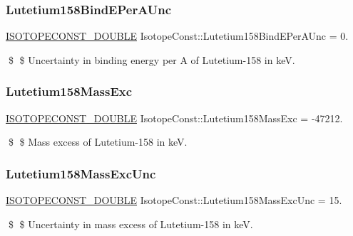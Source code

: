 \subsubsection{\texorpdfstring{Lutetium158\+Bind\+E\+Per\+A\+Unc}{Lutetium158BindEPerAUnc}}
{\footnotesize\ttfamily \mbox{\hyperlink{group___isotope_const-_macros_ga8f45a7272ce02c0b4c65c44636ed719a}{I\+S\+O\+T\+O\+P\+E\+C\+O\+N\+S\+T\+\_\+\+D\+O\+U\+B\+LE}} Isotope\+Const\+::\+Lutetium158\+Bind\+E\+Per\+A\+Unc = 0.}

\$ \$ Uncertainty in binding energy per A of Lutetium-\/158 in keV. \mbox{\label{group___isotope_const-_lutetium-_lu158_ga5008222e3ab0ffd98f5446f3a28b42ee}} 
\subsubsection{\texorpdfstring{Lutetium158\+Mass\+Exc}{Lutetium158MassExc}}
{\footnotesize\ttfamily \mbox{\hyperlink{group___isotope_const-_macros_ga8f45a7272ce02c0b4c65c44636ed719a}{I\+S\+O\+T\+O\+P\+E\+C\+O\+N\+S\+T\+\_\+\+D\+O\+U\+B\+LE}} Isotope\+Const\+::\+Lutetium158\+Mass\+Exc = -\/47212.}

\$ \$ Mass excess of Lutetium-\/158 in keV. \mbox{\label{group___isotope_const-_lutetium-_lu158_gaa4c09ac96b810bd100655731135d9962}} 
\subsubsection{\texorpdfstring{Lutetium158\+Mass\+Exc\+Unc}{Lutetium158MassExcUnc}}
{\footnotesize\ttfamily \mbox{\hyperlink{group___isotope_const-_macros_ga8f45a7272ce02c0b4c65c44636ed719a}{I\+S\+O\+T\+O\+P\+E\+C\+O\+N\+S\+T\+\_\+\+D\+O\+U\+B\+LE}} Isotope\+Const\+::\+Lutetium158\+Mass\+Exc\+Unc = 15.}

\$ \$ Uncertainty in mass excess of Lutetium-\/158 in keV. \mbox{\label{group___isotope_const-_lutetium-_lu158_ga481dea106448b4df940371aa0dd7c3e0}} 
